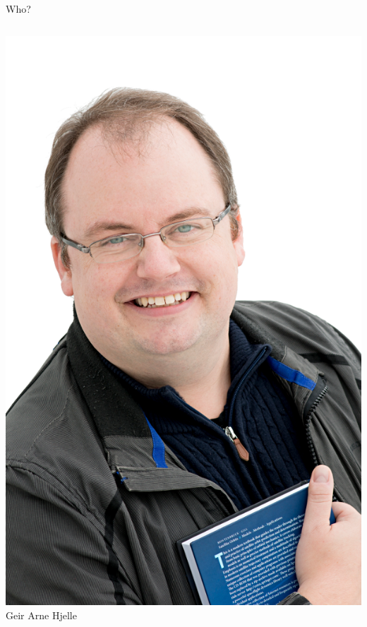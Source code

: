 \documentclass[ignorenonframetext,12pt,t]{beamer}
\begin{document}
\begin{frame}{Who?}
\begin{columns}[c]
    \begin{center}
      \includegraphics[width=\linewidth]{figure/geirarne} \\
      Geir Arne Hjelle
    \end{center}


\end{columns}
\end{frame}
\end{document}
